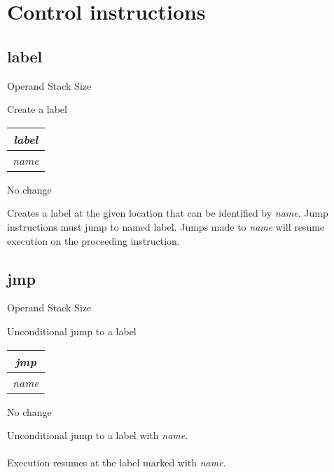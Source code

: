 \documentclass[12pt]{article}
\begin{document}
	\tableofcontents

	\newpage
	
	\section{Control instructions}
		\subsection*{label}
			\begin{labeling}{Operand Stack Size}
				\item [\textbf{Operation}] Create a label
				\item [\textbf{Format}] \begin{tabular}{| c |} \hline \textit{label} \\ \hline \textit{name} \\ \hline \end{tabular}
				\item [\textbf{Operand Stack}] No change
				\item [\textbf{Description}] 	Creates a label at the given location that can be identified by \textit{name}. Jump instructions must jump to named label. Jumps made to \textit{name} will resume execution on the proceeding instruction. 
			\end{labeling}
		\newpage 
		
		\subsection*{jmp}
			\begin{labeling}{Operand Stack Size}
				\item [\textbf{Operation}] Unconditional jump to a label
				\item [\textbf{Format}] \begin{tabular}{| c |} \hline \textit{jmp} \\ \hline \textit{name} \\ \hline \end{tabular}
				\item [\textbf{Operand Stack}] No change
				\item [\textbf{Description}] 	Unconditional jump to a label with \textit{name}. \\ \\ 
				Execution resumes at the label marked with \textit{name}.
			\end{labeling}
		\newpage
		
\end{document}
